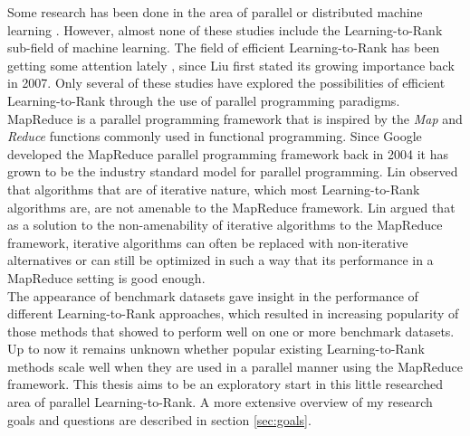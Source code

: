 Some research has been done in the area of parallel or distributed machine learning \cite{Chu2007,Chang2007}. However, almost none of these studies include the Learning-to-Rank sub-field of machine learning. The field of efficient Learning-to-Rank has been getting some attention lately \cite{Asadi2013a,Asadi2013b,Busa-Fekete2012,Sousa2012,Shukla2012}, since Liu \cite{Liu2007} first stated its growing importance back in 2007. Only several of these studies \cite{Sousa2012,Shukla2012} have explored the possibilities of efficient Learning-to-Rank through the use of parallel programming paradigms.\\

MapReduce \cite{Dean2004} is a parallel programming framework that is inspired by the \emph{Map} and \emph{Reduce} functions commonly used in functional programming. Since Google developed the MapReduce parallel programming framework back in 2004 it has grown to be the industry standard model for parallel programming. Lin \cite{Lin2013} observed that algorithms that are of iterative nature, which most Learning-to-Rank algorithms are, are not amenable to the MapReduce framework. Lin argued that as a solution to the non-amenability of iterative algorithms to the MapReduce framework, iterative algorithms can often be replaced with non-iterative alternatives or can still be optimized in such a way that its performance in a MapReduce setting is good enough.\\

The appearance of benchmark datasets gave insight in the performance of different Learning-to-Rank approaches, which resulted in increasing popularity of those methods that showed to perform well on one or more benchmark datasets. Up to now it remains unknown whether popular existing Learning-to-Rank methods scale well when they are used in a parallel manner using the MapReduce framework. This thesis aims to be an exploratory start in this little researched area of parallel Learning-to-Rank. A more extensive overview of my research goals and questions are described in section \ref{sec:goals}.\\

